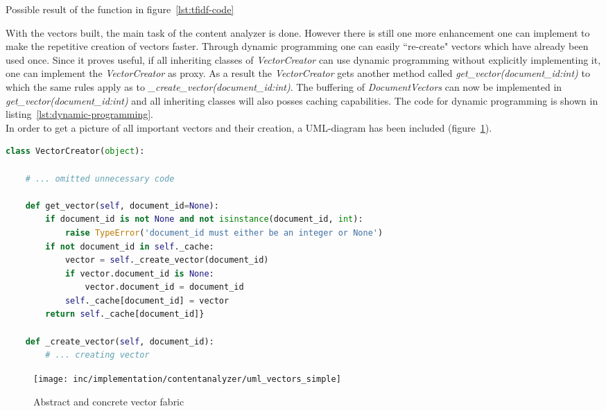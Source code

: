 \begin{table}
    \caption{Possible result of the function in figure~\ref{lst:tfidf-code}}
    \label{tab:tfidf-query-result}
\end{table}

\FloatBarrier

With the vectors built, the main task of the content analyzer is done.
However there is still one more enhancement one can implement to make the repetitive creation of vectors faster.
Through \gls{dynamic programming} one can easily ``re-create" vectors which have already been used once.
Since it proves useful, if all inheriting classes of \textit{VectorCreator} can use dynamic programming without explicitly implementing it, one can implement the \textit{VectorCreator} as \gls{proxy}.
As a result the \textit{VectorCreator} gets another method called \textit{get\_vector(document\_id:int)} to which the same rules apply as to \textit{\_create\_vector(document\_id:int)}.
The buffering of \textit{DocumentVectors} can now be implemented in \textit{get\_vector(document\_id:int)} and all inheriting classes will also posses caching capabilities.
The code for dynamic programming is shown in listing~\ref{lst:dynamic-programming}.\\
In order to get a picture of all important vectors and their creation, a UML-diagram has been included (figure~\ref{fig:uml-vectorssimple}).

\begin{lstlisting}[language=Python,caption={Dynamic programming},label={lst:dynamic-programming},float=h]
class VectorCreator(object):

    # ... omitted unnecessary code

    def get_vector(self, document_id=None):
        if document_id is not None and not isinstance(document_id, int):
            raise TypeError('document_id must either be an integer or None')
        if not document_id in self._cache:
            vector = self._create_vector(document_id)
            if vector.document_id is None:
                vector.document_id = document_id
            self._cache[document_id] = vector
        return self._cache[document_id]}

    def _create_vector(self, document_id):
        # ... creating vector
\end{lstlisting}


\begin{figure}[h]
    \center
    \texttt{[image: inc/implementation/contentanalyzer/uml\_vectors\_simple]}
    \caption{Abstract and concrete vector fabric}
    \label{fig:uml-vectorssimple}
\end{figure}
